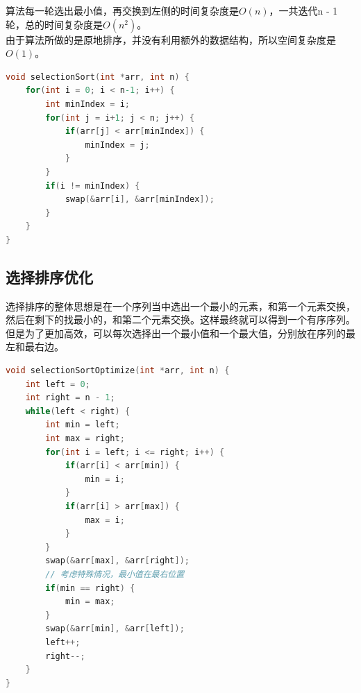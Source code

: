 算法每一轮选出最小值，再交换到左侧的时间复杂度是$ O(n) $，一共迭代n - 1轮，总的时间复杂度是$ O(n^2) $。\\

由于算法所做的是原地排序，并没有利用额外的数据结构，所以空间复杂度是$ O(1) $。

\begin{table}[H]
	\centering
	\caption{选择排序算法分析}
\end{table}


\begin{lstlisting}[language=C]
void selectionSort(int *arr, int n) {
    for(int i = 0; i < n-1; i++) {
        int minIndex = i;
        for(int j = i+1; j < n; j++) {
            if(arr[j] < arr[minIndex]) {
                minIndex = j;
            }
        }
        if(i != minIndex) {
            swap(&arr[i], &arr[minIndex]);
        }
    }
}
\end{lstlisting}

\vspace{0.5cm}

\subsection{选择排序优化}

选择排序的整体思想是在一个序列当中选出一个最小的元素，和第一个元素交换，然后在剩下的找最小的，和第二个元素交换。这样最终就可以得到一个有序序列。但是为了更加高效，可以每次选择出一个最小值和一个最大值，分别放在序列的最左和最右边。\\


\begin{lstlisting}[language=C]
void selectionSortOptimize(int *arr, int n) {
    int left = 0;
    int right = n - 1;
    while(left < right) {
        int min = left;
        int max = right;
        for(int i = left; i <= right; i++) {
            if(arr[i] < arr[min]) {
                min = i;
            }
            if(arr[i] > arr[max]) {
                max = i;
            }
        }
        swap(&arr[max], &arr[right]);
        // 考虑特殊情况，最小值在最右位置
        if(min == right) {
            min = max;
        }
        swap(&arr[min], &arr[left]);
        left++;
        right--;
    }
}
\end{lstlisting}

